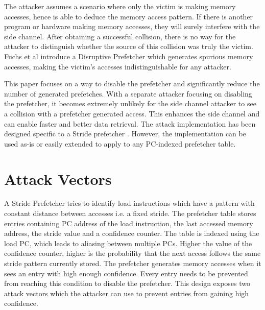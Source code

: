 The attacker assumes a scenario where only the victim is making memory
accesses, hence is able to deduce the memory access pattern. If there is
another program or hardware making memory accesses, they will surely
interfere with the side channel. After obtaining a successful collision,
there is no way for the attacker to distinguish whether the source of
this collision was truly the victim. Fuchs et al \cite{fuchs-disruptive}
introduce a Disruptive Prefetcher which generates spurious memory accesses,
making the victim's accesses indistinguishable for any attacker.

This paper focuses on a way to disable the prefetcher and significantly reduce
the number of generated prefetches. With a separate attacker focusing on disabling
the prefetcher, it becomes extremely unlikely for the side channel attacker to
see a collision with a prefetcher generated access. This enhances the side channel
and can enable faster and better data retrieval.
The attack implementation has been designed specific to a Stride prefetcher
\cite{fu-stride}. However, the implementation can be used as-is or easily extended
to apply to any PC-indexed prefetcher table.

\section{Attack Vectors}

A Stride Prefetcher tries to identify load instructions which have
a pattern with constant distance between accesses i.e. a fixed stride.
The prefetcher table stores entries containing PC address of the load
instruction, the last accessed memory address, the stride
value and a confidence counter. The table is indexed using the load PC,
which leads to aliasing between multiple PCs.
Higher the value of the confidence counter, higher is the probability that
the next access follows the same stride pattern currently stored.
The prefetcher generates memory accesses when it sees an entry with high
enough confidence. Every entry needs to be prevented from reaching this condition
to disable the prefetcher. This design exposes two attack vectors which the
attacker can use to prevent entries from gaining high confidence.

